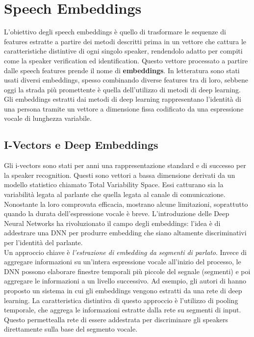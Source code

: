 \section{Speech Embeddings}
L'obiettivo degli speech embeddings è quello di trasformare le sequenze di features estratte a partire dei metodi descritti prima
in un vettore che cattura le caratteristiche distintive di ogni singolo speaker, rendendolo adatto per compiti come la speaker verification ed identification. 
Questo vettore processato a partire dalle speech features prende il nome di \textbf{embeddings}. In letteratura sono stati usati diversi
embeddings, spesso combinando diverse features tra di loro, sebbene oggi la strada più promettente è quella dell'utilizzo di metodi di deep learning. 
Gli embeddings estratti dai metodi di deep learning rappresentano l'identità di una persona tramite un vettore a dimensione fissa codificato da una espressione
vocale di lunghezza variabile. 

\subsection{I-Vectors e Deep Embeddings}
Gli i-vectors sono stati per anni una rappresentazione standard e di successo per la speaker recognition. Questi sono vettori a bassa dimensione derivati
da un modello statistico chiamato Total Variability Space. Essi catturano sia la variabilità legata al parlante che quella legata al canale di comunicazione. 
Nonostante la loro comprovata efficacia, mostrano alcune limitazioni, soprattutto quando la durata dell'espressione vocale è breve. 
L'introduzione delle Deep Neural Networks ha rivoluzionato il campo degli embeddings: l'idea è di addestrare una DNN per produrre 
embedding che siano altamente discriminativi per l'identità del parlante. \\
Un approccio chiave è \textit{l'estrazione di embedding da segmenti di parlato}. Invece di aggregare informazioni su un'intera espressione 
vocale all'inizio del processo, le DNN possono elaborare finestre temporali più piccole del segnale (segmenti) e poi aggregare le 
informazioni a un livello successivo. Ad esempio, gli autori di \cite{snyder2017deep} hanno proposto un sistema in cui gli embeddings 
vengono estratti da una rete di deep learning. La caratteristica distintiva di questo approccio è l'utilizzo di pooling temporale, che aggrega le informazioni 
estratte dalla rete su segmenti di input. Questo permettealla rete di essere addestrata per discriminare gli speakers direttamente sulla base 
del segmento vocale. 

